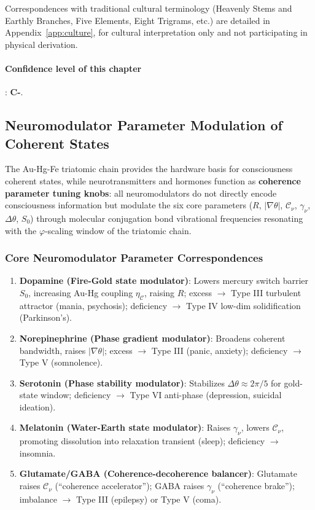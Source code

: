 \documentclass[12pt,a4paper,twocolumn]{article}
\renewcommand{\phi}{\varphi}
\begin{document}
Correspondences with traditional cultural terminology (Heavenly Stems and Earthly Branches, Five Elements, Eight Trigrams, etc.) are detailed in Appendix~\ref{app:culture}, for cultural interpretation only and not participating in physical derivation.

\paragraph{Confidence level of this chapter}: \textbf{C-}.


\subsection{Neuromodulator Parameter Modulation of Coherent States}
\label{subsec:neuromodulator}
The Au-Hg-Fe triatomic chain provides the hardware basis for consciousness coherent states, while neurotransmitters and hormones function as \textbf{coherence parameter tuning knobs}: all neuromodulators do not directly encode consciousness information but modulate the six core parameters ($R$, $|\nabla\theta|$, $\mathcal{C}_\nu$, $\gamma_\nu$, $\Delta\theta$, $S_0$) through molecular conjugation bond vibrational frequencies resonating with the $\phi$-scaling window of the triatomic chain.

\subsubsection{Core Neuromodulator Parameter Correspondences}
\begin{enumerate}
\item \textbf{Dopamine (Fire-Gold state modulator)}: Lowers mercury switch barrier $S_0$, increasing Au-Hg coupling $\eta_\mathcal{C}$, raising $R$; excess $\to$ Type III turbulent attractor (mania, psychosis); deficiency $\to$ Type IV low-dim solidification (Parkinson's).
\item \textbf{Norepinephrine (Phase gradient modulator)}: Broadens coherent bandwidth, raises $|\nabla\theta|$; excess $\to$ Type III (panic, anxiety); deficiency $\to$ Type V (somnolence).
\item \textbf{Serotonin (Phase stability modulator)}: Stabilizes $\Delta\theta\approx2\pi/5$ for gold-state window; deficiency $\to$ Type VI anti-phase (depression, suicidal ideation).
\item \textbf{Melatonin (Water-Earth state modulator)}: Raises $\gamma_\nu$, lowers $\mathcal{C}_\nu$, promoting dissolution into relaxation transient (sleep); deficiency $\to$ insomnia.
\item \textbf{Glutamate/GABA (Coherence-decoherence balancer)}: Glutamate raises $\mathcal{C}_\nu$ (``coherence accelerator''); GABA raises $\gamma_\nu$ (``coherence brake''); imbalance $\to$ Type III (epilepsy) or Type V (coma).
\end{enumerate}
\end{document}
